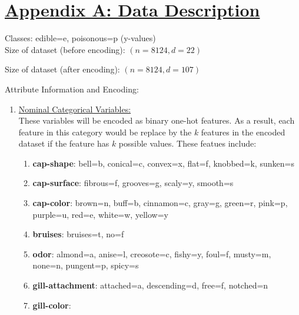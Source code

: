 \documentclass[fleqn]{article}
\begin{document}
    \newpage
    \section*{\underline{Appendix A: Data Description}}
    Classes: edible=e, poisonous=p (y-values)\\

    Size of dataset (before encoding): $ (n=8124, d=22) $

    Size of dataset (after encoding): $ (n=8124, d=107) $

    Attribute Information and Encoding:
    \begin{enumerate}
        \item \underline{Nominal Categorical Variables:}\\
        These variables will be encoded as binary one-hot features. As a result, each feature
        in this category would be replace by the $ k $ features in the encoded dataset if the
        feature has $ k $ possible values. These featues include:
        \begin{enumerate}[label=\roman*.]
            \item \textbf{cap-shape}:
                bell=b,
                conical=c,
                convex=x,
                flat=f,
                knobbed=k,
                sunken=s
            \item \textbf{cap-surface}:
                fibrous=f,
                grooves=g,
                scaly=y,
                smooth=s
            \item \textbf{cap-color}:
                brown=n,
                buff=b,
                cinnamon=c,
                gray=g,
                green=r,
                pink=p,
                purple=u,
                red=e,
                white=w,
                yellow=y
            \item \textbf{bruises}:
                bruises=t,
                no=f
            \item \textbf{odor}:
                almond=a,
                anise=l,
                creosote=c,
                fishy=y,
                foul=f,
                musty=m,
                none=n,
                pungent=p,
                spicy=s
            \item \textbf{gill-attachment}:
                attached=a,
                descending=d,
                free=f,
                notched=n
            \item \textbf{gill-color}:

\end{enumerate}
\end{enumerate}
\end{document}
